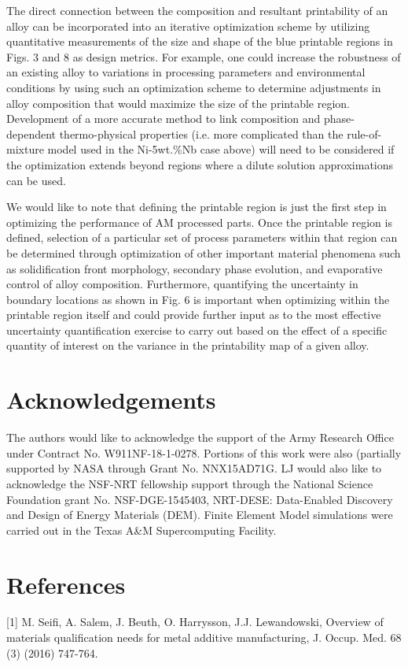\documentclass[10pt]{article}
\begin{document}
The direct connection between the composition and resultant printability of an alloy can be incorporated into an iterative optimization scheme by utilizing quantitative measurements of the size and shape of the blue printable regions in Figs. 3 and 8 as design metrics. For example, one could increase the robustness of an existing alloy to variations in processing parameters and environmental conditions by using such an optimization scheme to determine adjustments in alloy composition that would maximize the size of the printable region. Development of a more accurate method to link composition and phase-dependent thermo-physical properties (i.e. more complicated than the rule-of-mixture model used in the Ni-5wt.\%Nb case above) will need to be considered if the optimization extends beyond regions where a dilute solution approximations can be used.

We would like to note that defining the printable region is just the first step in optimizing the performance of AM processed parts. Once the printable region is defined, selection of a particular set of process parameters within that region can be determined through optimization of other important material phenomena such as solidification front morphology, secondary phase evolution, and evaporative control of alloy composition. Furthermore, quantifying the uncertainty in boundary locations as shown in Fig. 6 is important when optimizing within the printable region itself and could provide further input as to the most effective uncertainty quantification exercise to carry out based on the effect of a specific quantity of interest on the variance in the printability map of a given alloy.

\section*{Acknowledgements}
The authors would like to acknowledge the support of the Army Research Office under Contract No. W911NF-18-1-0278. Portions of this work were also (partially supported by NASA through Grant No. NNX15AD71G. LJ would also like to acknowledge the NSF-NRT fellowship support through the National Science Foundation grant No. NSF-DGE-1545403, NRT-DESE: Data-Enabled Discovery and Design of Energy Materials (DEM). Finite Element Model simulations were carried out in the Texas A\&M Supercomputing Facility.

\section*{References}
[1] M. Seifi, A. Salem, J. Beuth, O. Harrysson, J.J. Lewandowski, Overview of materials qualification needs for metal additive manufacturing, J. Occup. Med. 68 (3) (2016) 747-764.
\end{document}
